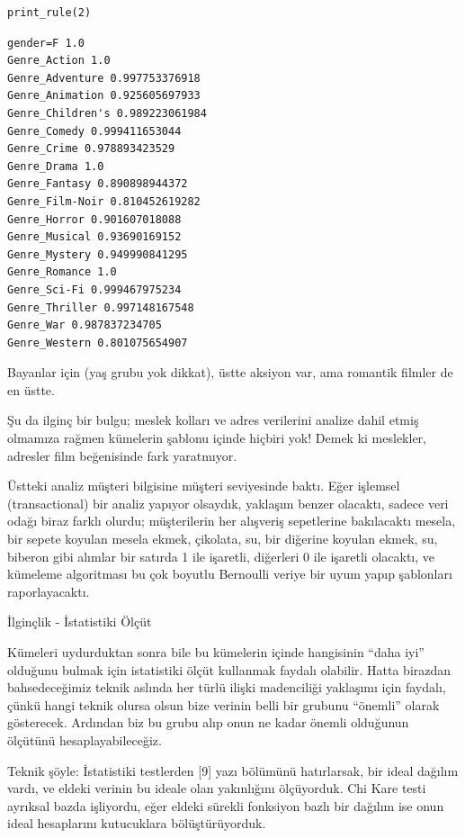\documentclass[12pt,fleqn]{article}\usepackage{../../common}
\begin{document}
\begin{verbatim}
print_rule(2)
\end{verbatim}

\begin{verbatim}
gender=F 1.0
Genre_Action 1.0
Genre_Adventure 0.997753376918
Genre_Animation 0.925605697933
Genre_Children's 0.989223061984
Genre_Comedy 0.999411653044
Genre_Crime 0.978893423529
Genre_Drama 1.0
Genre_Fantasy 0.890898944372
Genre_Film-Noir 0.810452619282
Genre_Horror 0.901607018088
Genre_Musical 0.93690169152
Genre_Mystery 0.949990841295
Genre_Romance 1.0
Genre_Sci-Fi 0.999467975234
Genre_Thriller 0.997148167548
Genre_War 0.987837234705
Genre_Western 0.801075654907
\end{verbatim}

Bayanlar için (yaş grubu yok dikkat), üstte aksiyon var, ama romantik
filmler de en üstte. 

Şu da ilginç bir bulgu; meslek kolları ve adres verilerini analize dahil
etmiş olmamıza rağmen kümelerin şablonu içinde hiçbiri yok! Demek ki
meslekler, adresler film beğenisinde fark yaratmıyor.

Üstteki analiz müşteri bilgisine müşteri seviyesinde baktı. Eğer işlemsel
(transactional) bir analiz yapıyor olsaydık, yaklaşım benzer olacaktı,
sadece veri odağı biraz farklı olurdu; müşterilerin her alışveriş
sepetlerine bakılacaktı mesela, bir sepete koyulan mesela ekmek, çikolata,
su, bir diğerine koyulan ekmek, su, biberon gibi alımlar bir satırda 1 ile
işaretli, diğerleri 0 ile işaretli olacaktı, ve kümeleme algoritması bu çok
boyutlu Bernoulli veriye bir uyum yapıp şablonları raporlayacaktı.

İlginçlik - İstatistiki Ölçüt

Kümeleri uydurduktan sonra bile bu kümelerin içinde hangisinin ``daha iyi''
olduğunu bulmak için istatistiki ölçüt kullanmak faydalı olabilir. Hatta
birazdan bahsedeceğimiz teknik aslında her türlü ilişki madenciliği
yaklaşımı için faydalı, çünkü hangi teknik olursa olsun bize verinin belli
bir grubunu ``önemli'' olarak gösterecek. Ardından biz bu grubu alıp onun
ne kadar önemli olduğunun ölçütünü hesaplayabileceğiz.

Teknik şöyle: İstatistiki testlerden [9] yazı bölümünü hatırlarsak, bir
ideal dağılım vardı, ve eldeki verinin bu ideale olan yakınlığını
ölçüyorduk. Chi Kare testi ayrıksal bazda işliyordu, eğer eldeki sürekli
fonksiyon bazlı bir dağılım ise onun ideal hesaplarını kutucuklara
bölüştürüyorduk.
\end{document}
